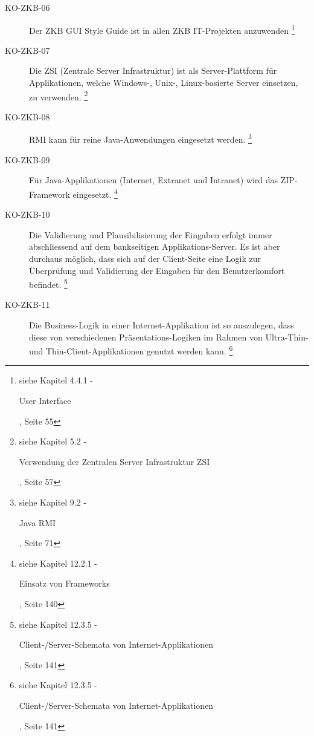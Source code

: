 \documentclass[abstracton, listof=totocnumbered,
bibliography=totocnumbered]{scrreprt}
\begin{document}
\begin{description}
    \item[KO-ZKB-06] Der ZKB GUI Style Guide ist in allen ZKB IT-Projekten
    anzuwenden
    \footnote{siehe Kapitel 4.4.1 -
    \begin{itshape}User Interface\end{itshape}, Seite 55}
    
    \item[KO-ZKB-07] Die ZSI (Zentrale Server Infrastruktur) ist als
    Server-Plattform für Applikationen, welche Windows-, Unix-, Linux-basierte
    Server einsetzen, zu verwenden.
    \footnote{siehe Kapitel 5.2 -
    \begin{itshape}Verwendung der Zentralen Server Infrastruktur
    ZSI\end{itshape}, Seite 57}
    
    \item[KO-ZKB-08] RMI kann für reine Java-Anwendungen eingesetzt werden.
    \footnote{siehe Kapitel 9.2 -
    \begin{itshape}Java RMI\end{itshape}, Seite 71}
    
    \item[KO-ZKB-09] Für Java-Applikationen (Internet, Extranet und Intranet)
    wird das ZIP-Framework eingesetzt.
    \footnote{siehe Kapitel 12.2.1 -
    \begin{itshape}Einsatz von Frameworks\end{itshape}, Seite 140}
    
    \item[KO-ZKB-10] Die Validierung und Plausibilisierung der Eingaben erfolgt
    immer abschliessend auf dem bankseitigen Applikations-Server. Es ist aber
    durchaus möglich, dass sich auf der Client-Seite eine Logik zur
    Überprüfung und Validierung der Eingaben für den Benutzerkomfort
    befindet.
    \footnote{siehe Kapitel 12.3.5 -
    \begin{itshape}Client-/Server-Schemata von Internet-Applikationen\end{itshape}, Seite 141}
    
    \item[KO-ZKB-11] Die Business-Logik in einer Internet-Applikation ist so
    auszulegen, dass diese von verschiedenen Präsentations-Logiken im Rahmen
    von Ultra-Thin- und Thin-Client-Applikationen genutzt werden kann.
    \footnote{siehe Kapitel 12.3.5 -
    \begin{itshape}Client-/Server-Schemata von Internet-Applikationen\end{itshape}, Seite 141}
    

\end{description}
\end{document}
